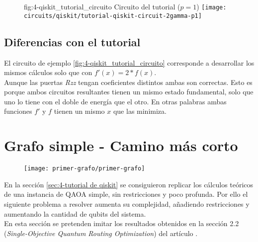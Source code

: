 \begin{figure}[htbp]{fig:4-qiskit_tutorial_circuito}{ Circuito del tutorial ($p=1$) }
  \centering
  \texttt{[image: circuits/qiskit/tutorial-qiskit-circuit-2gamma-p1]}
\end{figure}

\subsection{Diferencias con el tutorial}

El circuito de ejemplo \ref{fig:4-qiskit_tutorial_circuito} corresponde a desarrollar los mismos cálculos solo que con $f'(x) = 2*f(x)$. \\
Aunque las puertas \textit{Rzz} tengan coeficientes distintos ambas son correctas. Esto es porque ambos circuitos resultantes tienen un mismo estado fundamental, solo que uno lo tiene con el doble de energía que el otro. En otras palabras ambas funciones $f'$ y $f$ tienen un mismo $x$ que las minimiza.

\section{Grafo simple - Camino más corto}
\label{sec:4-primer grafo}

\begin{figure}[htbp]{}{}
  \centering
  \texttt{[image: primer-grafo/primer-grafo]}
\end{figure}

En la sección \ref{sec:4-tutorial de qiskit} se consiguieron replicar los cálculos teóricos de una instancia de QAOA simple, sin restricciones y poco profunda. Por ello el siguiente problema a resolver aumenta su complejidad, añadiendo restricciones y aumentando la cantidad de qubits del sistema. \\
En esta sección se pretenden imitar los resultados obtenidos en la sección 2.2 (\textit{Single-Objective Quantum Routing Optimization}) del artículo \cite{multi-objective_routing_optimization}.


